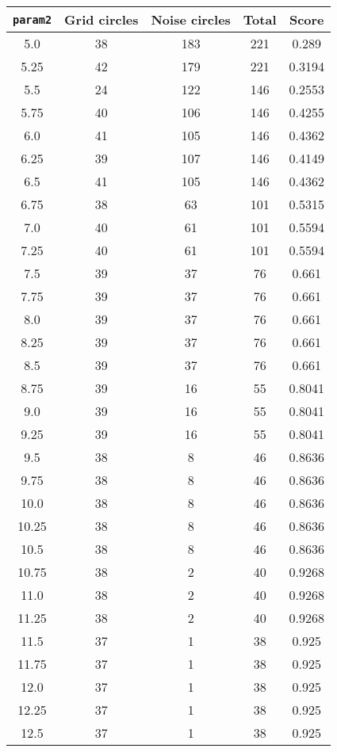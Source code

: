 \documentclass[letterpaper, 12pt]{article}
\begin{document}
\begin{longtable}{|c|c|c|c|c|}
\hline
\textbf{\texttt{param2}} & \textbf{Grid circles} & \textbf{Noise circles} & \textbf{Total} & \textbf{Score} \\
\hline
5.0 & 38 & 183 & 221 & 0.289 \\
\hline
5.25 & 42 & 179 & 221 & 0.3194 \\
\hline
5.5 & 24 & 122 & 146 & 0.2553 \\
\hline
5.75 & 40 & 106 & 146 & 0.4255 \\
\hline
6.0 & 41 & 105 & 146 & 0.4362 \\
\hline
6.25 & 39 & 107 & 146 & 0.4149 \\
\hline
6.5 & 41 & 105 & 146 & 0.4362 \\
\hline
6.75 & 38 & 63 & 101 & 0.5315 \\
\hline
7.0 & 40 & 61 & 101 & 0.5594 \\
\hline
7.25 & 40 & 61 & 101 & 0.5594 \\
\hline
7.5 & 39 & 37 & 76 & 0.661 \\
\hline
7.75 & 39 & 37 & 76 & 0.661 \\
\hline
8.0 & 39 & 37 & 76 & 0.661 \\
\hline
8.25 & 39 & 37 & 76 & 0.661 \\
\hline
8.5 & 39 & 37 & 76 & 0.661 \\
\hline
8.75 & 39 & 16 & 55 & 0.8041 \\
\hline
9.0 & 39 & 16 & 55 & 0.8041 \\
\hline
9.25 & 39 & 16 & 55 & 0.8041 \\
\hline
9.5 & 38 & 8 & 46 & 0.8636 \\
\hline
9.75 & 38 & 8 & 46 & 0.8636 \\
\hline
10.0 & 38 & 8 & 46 & 0.8636 \\
\hline
10.25 & 38 & 8 & 46 & 0.8636 \\
\hline
10.5 & 38 & 8 & 46 & 0.8636 \\
\hline
10.75 & 38 & 2 & 40 & 0.9268 \\
\hline
11.0 & 38 & 2 & 40 & 0.9268 \\
\hline
11.25 & 38 & 2 & 40 & 0.9268 \\
\hline
11.5 & 37 & 1 & 38 & 0.925 \\
\hline
11.75 & 37 & 1 & 38 & 0.925 \\
\hline
12.0 & 37 & 1 & 38 & 0.925 \\
\hline
12.25 & 37 & 1 & 38 & 0.925 \\
\hline
12.5 & 37 & 1 & 38 & 0.925 \\

\end{longtable}
\end{document}
